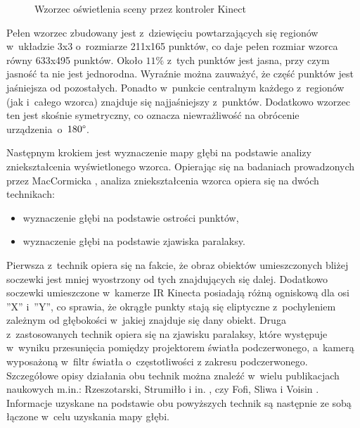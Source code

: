 \begin{savenotes}
\begin{figure}[!htb]
\begin{minipage}[b]{0.48\linewidth}
			\caption[Wzorzec oświetlenia sceny przez kontroler Kinect]{Wzorzec oświetlenia sceny przez kontroler Kinect}
			\label{fig:characteristics:kinect:dotPattern}
		\end{minipage}	
	\end{figure}
\end{savenotes}
																																	
Pełen wzorzec zbudowany jest z~dziewięciu powtarzających się regionów w~układzie 3x3 o~rozmiarze 211x165 punktów, co daje pełen rozmiar wzorca równy 633x495 punktów. Około $11\%$ z~tych punktów jest jasna, przy czym jasność ta nie jest jednorodna. Wyraźnie można zauważyć, że część punktów jest jaśniejsza od pozostałych. Ponadto w~punkcie centralnym każdego z~regionów (jak i~całego wzorca) znajduje się najjaśniejszy z~punktów. Dodatkowo wzorzec ten jest skośnie symetryczny, co oznacza niewrażliwość na obrócenie urządzenia~o~$180\degree$.
																																	
Następnym krokiem jest wyznaczenie mapy głębi na podstawie analizy zniekształcenia wyświetlonego wzorca. Opierając się na badaniach prowadzonych przez MacCormicka \cite{MacCormick2011}, analiza zniekształcenia wzorca opiera się na dwóch technikach:
																																	
\begin{itemize}
	\item wyznaczenie głębi na podstawie ostrości punktów,
	\item wyznaczenie głębi na podstawie zjawiska paralaksy.
\end{itemize}
																																	
Pierwsza z~technik opiera się na fakcie, że obraz obiektów umieszczonych bliżej soczewki jest mniej wyostrzony od tych znajdujących się dalej. Dodatkowo soczewki umieszczone w~kamerze IR Kinecta posiadają różną ogniskową dla osi ''X'' i~''Y'', co sprawia, że okrągłe punkty stają się eliptyczne z~pochyleniem zależnym od głębokości w~jakiej znajduje się dany obiekt. Druga z~zastosowanych technik opiera się na zjawisku paralaksy, które występuje w~wyniku przesunięcia pomiędzy projektorem światła podczerwonego, a~kamerą wyposażoną w~filtr światła o~częstotliwości z zakresu podczerwonego. Szczegółowe opisy działania obu technik można znaleźć w~wielu publikacjach naukowych m.in.: Rzeszotarski, Strumiłło i in. \cite{Rzeszotarski2006}, czy Fofi, Sliwa i Voisin \cite{Fofi2004}. Informacje uzyskane na podstawie obu powyższych technik są następnie ze sobą łączone w~celu uzyskania mapy głębi.
																																	
